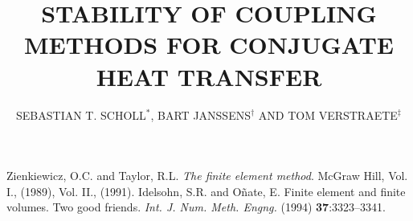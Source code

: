 \documentclass{coupled}
\title{STABILITY OF COUPLING METHODS FOR CONJUGATE HEAT TRANSFER}
\author{SEBASTIAN T. SCHOLL$^{*}$, BART JANSSENS$^{\dag}$ AND TOM VERSTRAETE$^{\ddag}$}
\begin{document}













\begin{thebibliography}{99}
  Zienkiewicz, O.C. and  Taylor, R.L. \textit{The finite element method}. McGraw Hill,
Vol. I., (1989), Vol. II., (1991).
 Idelsohn, S.R. and O\~{n}ate, E. Finite element and finite volumes. Two good friends.
\textit{Int. J. Num. Meth. Engng.} (1994) \textbf{37}:3323--3341.
\end{thebibliography}
\end{document}

